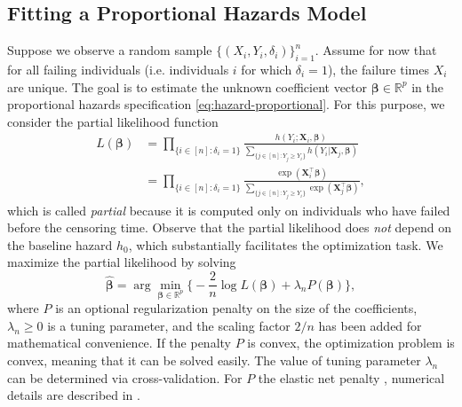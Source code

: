 \documentclass[11pt]{article}
\newcommand{\R}{\mathbb{R}}
\newcommand{\X}{\mathbf{X}}
\renewcommand{\b}{\bm{\beta}}
\begin{document}
\subsection{Fitting a Proportional Hazards Model}
Suppose we observe a random sample  $\big\{ (X_i, Y_i, \delta_i) \big\}_{i=1}^n$. Assume for now that for all failing individuals (i.e. individuals $i$ for which $\delta_i = 1$), the failure times $X_i$ are unique. The goal is to estimate the unknown coefficient vector $\b\in\R^p$ in the proportional hazards specification \eqref{eq:hazard-proportional}. For this purpose, we consider the partial likelihood function
\begin{equation} \label{eq:cox-likelihood}
    \begin{split}
        L(\b)
        &=
        \prod_{\{ i \in [n] : \delta_i = 1 \}}
        \frac{ h(Y_i ; \X_i, \b) }{ \sum_{\{ j\in[n] : Y_j \geq Y_i \}} h(Y_i | \X_j, \b) }
        \\
        &=
        \prod_{\{ i \in [n] : \delta_i = 1 \}}
        \frac{ \exp(\X_i^\top \b) }{ \sum_{\{ j\in[n] : Y_j \geq Y_i \}} \exp(\X_j^\top \b) },
    \end{split}
\end{equation}
which is called \textit{partial} because it is computed only on individuals who have failed before the censoring time. Observe that the partial likelihood does \textit{not} depend on the baseline hazard $h_0$, which substantially facilitates the optimization task. We maximize the partial likelihood by solving
\begin{equation} \label{eq:cox-problem}
	\widehat{\b} = \arg\min_{\b\in\R^p} 
	\bigg\{ 
		-\frac{2}{n} \log L(\b) + \lambda_n P(\b)
	\bigg\},
\end{equation}
where $P$ is an optional regularization penalty on the size of the coefficients, $\lambda_n\geq 0$ is a tuning parameter, and the scaling factor $2/n$ has been added for mathematical convenience. If the penalty $P$ is convex, the optimization problem is convex, meaning that it can be solved easily. The value of tuning parameter $\lambda_n$ can be determined via cross-validation. For $P$ the elastic net penalty \citep{zou2005}, numerical details are described in \cite{simon2011}.
\end{document}
